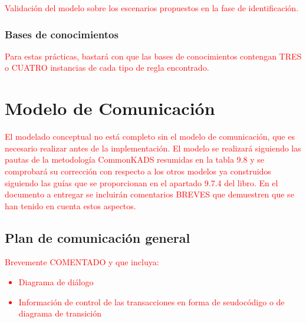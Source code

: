 \documentclass[12pt,a4paper,twoside,spanish]{article}      %
\begin{document}
\textcolor {red} {Validación del modelo sobre los escenarios propuestos en la fase de identificación.}

\subsubsection{Bases de conocimientos}

\textcolor {red} {Para estas prácticas, bastará con que las bases de conocimientos contengan TRES o CUATRO instancias de cada tipo de regla encontrado.}

\section{Modelo de Comunicación}

\textcolor {red} {El modelado conceptual no está completo sin el modelo de comunicación, que es necesario realizar antes de la implementación. El modelo se realizará siguiendo las pautas de la metodología CommonKADS resumidas en la tabla 9.8 y se comprobará su corrección con respecto a los otros modelos ya construidos siguiendo las guías que se proporcionan en el apartado 9.7.4 del libro. En el documento a entregar se incluirán comentarios BREVES que demuestren que se han tenido en cuenta estos aspectos.}

\subsection{Plan de comunicación general}

\textcolor {red}
{
Brevemente COMENTADO y que incluya:
\begin{itemize}
 \item Diagrama de diálogo
 \item Información de control de las transacciones en forma de
seudocódigo o de diagrama de transición
\end{itemize}
}
\end{document}
